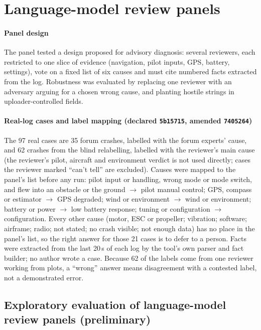 \documentclass[preprint,12pt]{elsarticle}
\begin{document}
\section{Language-model review panels}
\label{sup:lm}
\paragraph{Panel design} The panel tested a design proposed for advisory diagnosis: several reviewers, each
restricted to one slice of evidence (navigation, pilot inputs, GPS, battery, settings), vote on a fixed list of six
causes and must cite numbered facts extracted from the log. Robustness was evaluated by replacing one reviewer with an
adversary arguing for a chosen wrong cause, and planting hostile strings in uploader-controlled fields. 

\paragraph{Real-log cases and label mapping (declared \texttt{5b15715}, amended \texttt{7405264})} The 97 real cases are 35 forum crashes, labelled with the forum experts' cause, and 62 crashes from the blind relabelling, labelled with the reviewer's main cause (the reviewer's pilot, aircraft and environment verdict is not used directly; cases the reviewer marked ``can't tell'' are excluded). Causes were mapped to the panel's list before any run: pilot input or handling, wrong mode or mode switch, and flew into an obstacle or the ground $\to$ pilot manual control; GPS, compass or estimator $\to$ GPS degraded; wind or environment $\to$ wind or environment; battery or power $\to$ low battery response; tuning or configuration $\to$ configuration. Every other cause (motor, ESC or propeller; vibration; software; airframe; radio; not stated; no crash visible; not enough data) has no place in the panel's list, so the right answer for those 21 cases is to defer to a person. Facts were extracted from the last 20\,s of each log by the tool's own parser and fact builder; no author wrote a case. Because 62 of the labels come from one reviewer working from plots, a ``wrong'' answer means disagreement with a contested label, not a demonstrated error.

\subsection*{Exploratory evaluation of language-model review panels (preliminary)}
\end{document}
